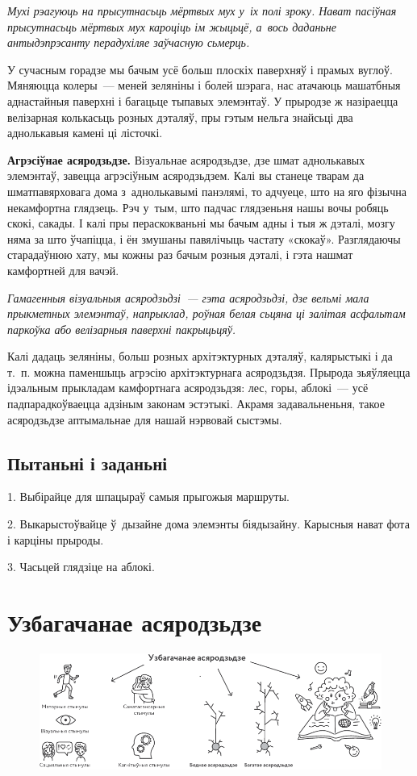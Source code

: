 \emph{Мухі рэагуюць на прысутнасьць мёртвых мух у~іх полі зроку. Нават пасіўная прысутнасьць мёртвых мух кароціць ім жыцьцё, а~вось даданьне антыдэпрэсанту перадухіляе заўчасную сьмерць.}

У сучасным горадзе мы бачым усё больш плоскіх паверхняў і прамых вуглоў. Мяняюцца колеры~--- меней зеляніны і болей шэрага, нас атачаюць машатбныя аднастайныя паверхні і багацьце тыпавых элемэнтаў. У прыродзе ж назіраецца велізарная колькасьць розных дэталяў, пры гэтым нельга знайсьці два аднолькавыя камені ці лісточкі.

\textbf{Агрэсіўнае асяродзьдзе.} Візуальнае асяродзьдзе, дзе шмат аднолькавых элемэнтаў, завецца агрэсіўным асяродзьдзем. Калі вы станеце тварам да шматпавярховага дома з~аднолькавымі панэлямі, то адчуеце, што на яго фізычна некамфортна глядзець. Рэч у~тым, што падчас глядзеньня нашы вочы робяць скокі, сакады. І калі пры пераскокваньні мы бачым адны і тыя ж дэталі, мозгу няма за што ўчапіцца, і ён змушаны павялічыць частату «скокаў». Разглядаючы старадаўнюю хату, мы кожны раз бачым розныя дэталі, і гэта нашмат камфортней для вачэй. 

\emph{Гамагенныя візуальныя асяродзьдзі~--- гэта асяродзьдзі, дзе вельмі мала прыкметных элемэнтаў, напрыклад, роўная белая сьцяна ці залітая асфальтам паркоўка або велізарныя паверхні пакрыцьцяў.}

Калі дадаць зеляніны, больш розных архітэктурных дэталяў, калярыстыкі і да т.~п. можна паменшыць агрэсію архітэктурнага асяродзьдзя. Прырода зьяўляецца ідэальным прыкладам камфортнага асяродзьдзя: лес, горы, аблокі~--- усё падпарадкоўваецца адзіным законам эстэтыкі. Акрамя задавальненьня, такое асяродзьдзе аптымальнае для нашай нэрвовай сыстэмы.

\subsection*{Пытаньні і заданьні}

1. Выбірайце для шпацыраў самыя прыгожыя маршруты.

2. Выкарыстоўвайце ў~дызайне дома элемэнты біядызайну. Карысныя нават фота і карціны прыроды.

3. Часьцей глядзіце на аблокі.


\section{Узбагачанае асяродзьдзе}

\begin{figure}[htb!]
  \centering
  \includegraphics[scale=1.2]{willpower/ch12/8.pdf}
\end{figure}

